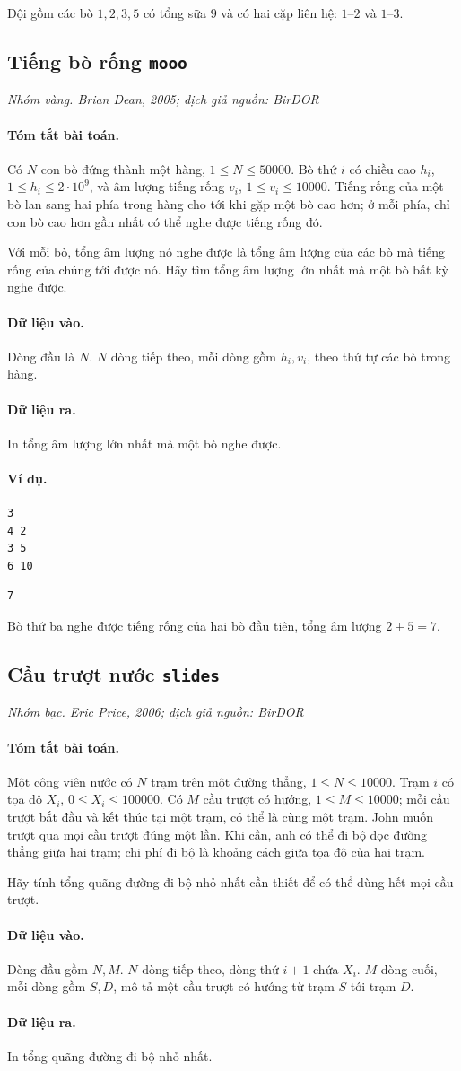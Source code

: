 \documentclass[11pt]{article}
\newcommand{\problem}[4]{%
  \subsection[#1 (#2)]{#1 \hfill {\normalsize\texttt{#2}}}%
  \noindent\textit{#3. #4}\par\smallskip
}
\newcommand{\iosec}[1]{\paragraph{#1}}
\begin{document}
Đội gồm các bò \(1,2,3,5\) có tổng sữa \(9\) và có hai cặp liên hệ:
\(1\)--\(2\) và \(1\)--\(3\).

\problem{Tiếng bò rống}{mooo}{Nhóm vàng}{Brian Dean, 2005; dịch giả nguồn: BirDOR}

\iosec{Tóm tắt bài toán.}
Có \(N\) con bò đứng thành một hàng, \(1\le N\le 50000\). Bò thứ \(i\) có
chiều cao \(h_i\), \(1\le h_i\le 2\cdot 10^9\), và âm lượng tiếng rống
\(v_i\), \(1\le v_i\le 10000\). Tiếng rống của một bò lan sang hai phía trong
hàng cho tới khi gặp một bò cao hơn; ở mỗi phía, chỉ con bò cao hơn gần nhất
có thể nghe được tiếng rống đó.

Với mỗi bò, tổng âm lượng nó nghe được là tổng âm lượng của các bò mà tiếng
rống của chúng tới được nó. Hãy tìm tổng âm lượng lớn nhất mà một bò bất kỳ
nghe được.

\iosec{Dữ liệu vào.}
Dòng đầu là \(N\). \(N\) dòng tiếp theo, mỗi dòng gồm \(h_i,v_i\), theo thứ tự
các bò trong hàng.

\iosec{Dữ liệu ra.}
In tổng âm lượng lớn nhất mà một bò nghe được.

\iosec{Ví dụ.}
\begin{verbatim}
3
4 2
3 5
6 10
\end{verbatim}

\begin{verbatim}
7
\end{verbatim}

Bò thứ ba nghe được tiếng rống của hai bò đầu tiên, tổng âm lượng
\(2+5=7\).

\problem{Cầu trượt nước}{slides}{Nhóm bạc}{Eric Price, 2006; dịch giả nguồn: BirDOR}

\iosec{Tóm tắt bài toán.}
Một công viên nước có \(N\) trạm trên một đường thẳng, \(1\le N\le 10000\).
Trạm \(i\) có tọa độ \(X_i\), \(0\le X_i\le 100000\). Có \(M\) cầu trượt có
hướng, \(1\le M\le 10000\); mỗi cầu trượt bắt đầu và kết thúc tại một trạm,
có thể là cùng một trạm. John muốn trượt qua mọi cầu trượt đúng một lần. Khi
cần, anh có thể đi bộ dọc đường thẳng giữa hai trạm; chi phí đi bộ là khoảng
cách giữa tọa độ của hai trạm.

Hãy tính tổng quãng đường đi bộ nhỏ nhất cần thiết để có thể dùng hết mọi cầu
trượt.

\iosec{Dữ liệu vào.}
Dòng đầu gồm \(N,M\). \(N\) dòng tiếp theo, dòng thứ \(i+1\) chứa \(X_i\).
\(M\) dòng cuối, mỗi dòng gồm \(S,D\), mô tả một cầu trượt có hướng từ trạm
\(S\) tới trạm \(D\).

\iosec{Dữ liệu ra.}
In tổng quãng đường đi bộ nhỏ nhất.
\end{document}
